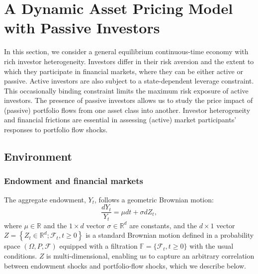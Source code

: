 
\section{A Dynamic Asset Pricing Model with Passive Investors}\label{sec:model}

In this section, we consider a general equilibrium continuous-time economy with rich investor heterogeneity. Investors differ in their risk aversion and the extent to which they participate in financial markets, where they can be either active or passive. Active investors are also subject to a state-dependent leverage constraint. This occasionally binding constraint limits the maximum risk exposure of active investors. 
The presence of passive investors allows us to study the price impact of (passive) portfolio flows from one asset class into another. Investor heterogeneity and financial frictions are essential in assessing (active) market participants' responses to portfolio flow shocks.

\subsection{Environment}

\subsubsection{Endowment and financial markets}

The aggregate endowment, $Y_t$, follows a geometric Brownian motion:
\begin{equation}\label{eq:agg_endow}
    \frac{d Y_t}{Y_t} = \mu dt + \sigma dZ_t,
\end{equation}
where $\mu\in\mathbb{R}$ and the $1\times d$ vector $\sigma\in\mathbb{R}^d$ are constants, and the $d\times 1 $ vector $Z=\left\lbrace Z_t\in\mathbb{R}^d;\mathcal{F}_t, t\geq 0\right\rbrace$ is a standard Brownian motion defined in a probability space $(\Omega, P, \mathcal{F})$ equipped with a filtration $\mathbb{F} =\{\mathcal{F}_t,t\geq 0\} $ with the usual conditions. 
$Z$ is multi-dimensional, enabling us to capture an arbitrary correlation between endowment shocks and portfolio-flow shocks, which we describe below.

